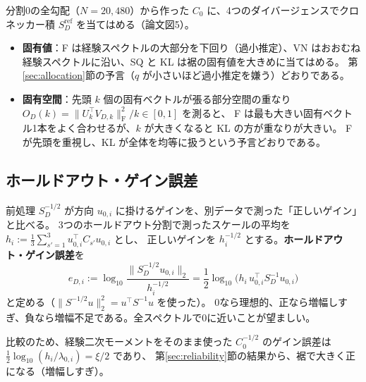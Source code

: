 \documentclass[a4paper,11pt]{ltjsarticle}
\theoremstyle{definition}
\theoremstyle{plain}
\newcommand{\norm}[1]{\lVert #1\rVert}
\newcommand{\Fro}{\mathrm{F}}
\newcommand{\T}{^{\top}}
\begin{document}
分割0の全勾配（$N = 20{,}480$）から作った $C_0$ に、4つのダイバージェンスでクロネッカー積 $S_D^{\mathrm{ref}}$ を当てはめる（論文図5）。
\begin{itemize}
  \item \textbf{固有値}：F は経験スペクトルの大部分を下回り（過小推定）、VN はおおむね経験スペクトルに沿い、SQ と KL は裾の固有値を大きめに当てはめる。
        第\ref{sec:allocation}節の予言（$q$ が小さいほど過小推定を嫌う）どおりである。
  \item \textbf{固有空間}：先頭 $k$ 個の固有ベクトルが張る部分空間の重なり $O_D(k) = \norm{U_k\T V_{D,k}}_\Fro^2/k\in[0,1]$ を測ると、
        F は最も大きい固有ベクトル1本をよく合わせるが、$k$ が大きくなると KL の方が重なりが大きい。
        F が先頭を重視し、KL が全体を均等に扱うという予言どおりである。
\end{itemize}

\subsection{ホールドアウト・ゲイン誤差}

前処理 $S_D^{-1/2}$ が方向 $u_{0,i}$ に掛けるゲインを、別データで測った「正しいゲイン」と比べる。
3つのホールドアウト分割で測ったスケールの平均を $h_i := \frac13\sum_{s'=1}^3u_{0,i}\T C_{s'}u_{0,i}$ とし、
正しいゲインを $h_i^{-1/2}$ とする。\textbf{ホールドアウト・ゲイン誤差}を
\begin{equation}\label{eq:gain-err}
  e_{D,i} := \log_{10}\frac{\norm{S_D^{-1/2}u_{0,i}}_2}{h_i^{-1/2}} = \frac12\log_{10}\bigl(h_i\,u_{0,i}\T S_D^{-1}u_{0,i}\bigr)
\end{equation}
と定める（$\norm{S^{-1/2}u}_2^2 = u\T S^{-1}u$ を使った）。
0なら理想的、正なら増幅しすぎ、負なら増幅不足である。全スペクトルで0に近いことが望ましい。

比較のため、経験二次モーメントをそのまま使った $C_0^{-1/2}$ のゲイン誤差は $\frac12\log_{10}(h_i/\lambda_{0,i}) = \xi/2$ であり、
第\ref{sec:reliability}節の結果から、裾で大きく正になる（増幅しすぎ）。
\end{document}

